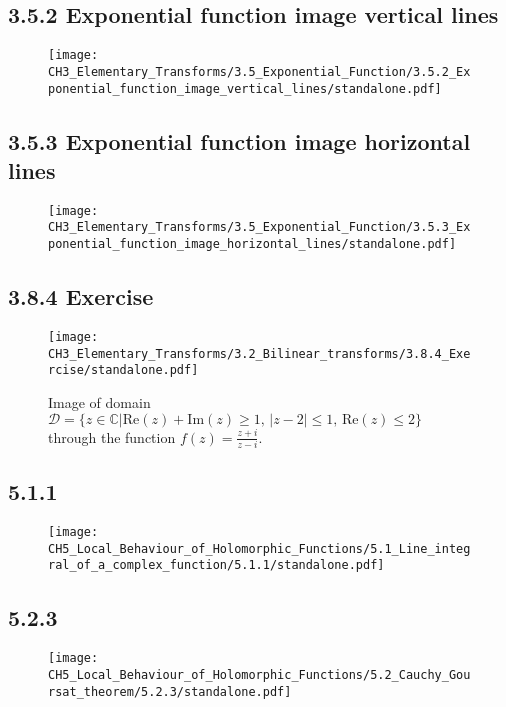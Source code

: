 \documentclass{book}
\begin{document}
\subsection*{3.5.2 Exponential function image vertical lines}
\begin{figure}[H]
\centering
\texttt{[image: CH3\_Elementary\_Transforms/3.5\_Exponential\_Function/3.5.2\_Exponential\_function\_image\_vertical\_lines/standalone.pdf]}
\caption{}
\end{figure}

\subsection*{3.5.3 Exponential function image horizontal lines}
\begin{figure}[H]
\centering
\texttt{[image: CH3\_Elementary\_Transforms/3.5\_Exponential\_Function/3.5.3\_Exponential\_function\_image\_horizontal\_lines/standalone.pdf]}
\caption{}
\end{figure}

\subsection*{3.8.4 Exercise}
\begin{figure}[H]
\centering
\texttt{[image: CH3\_Elementary\_Transforms/3.2\_Bilinear\_transforms/3.8.4\_Exercise/standalone.pdf]}
\caption{Image of domain $\mathcal{D} = \{z\in \mathbb{C} | \text{Re}(z) + \text{Im}(z) \ge 1, \, |z-2| \le 1, \, \text{Re}(z) \le 2 \}$ through the function $f(z) = \frac{z+i}{z-i}$.}
\end{figure}

\subsection*{5.1.1}
\begin{figure}[H]
\centering
\texttt{[image: CH5\_Local\_Behaviour\_of\_Holomorphic\_Functions/5.1\_Line\_integral\_of\_a\_complex\_function/5.1.1/standalone.pdf]}
\caption{}
\end{figure}

\subsection*{5.2.3}
\begin{figure}[H]
\centering
\texttt{[image: CH5\_Local\_Behaviour\_of\_Holomorphic\_Functions/5.2\_Cauchy\_Goursat\_theorem/5.2.3/standalone.pdf]}
\caption{}
\end{figure}
\end{document}
